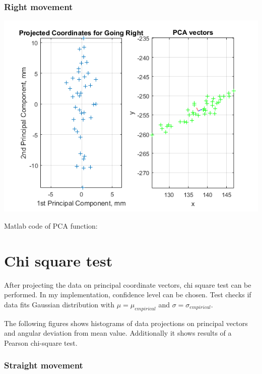 \documentclass[a4paper, 12pt]{article}
\begin{document}
\subsubsection{Right movement}

\begin{center}
  \includegraphics[scale=0.8]{rr1}
\end{center}

\newpage

Matlab code of PCA function:





\section{Chi square test}
After projecting the data on principal coordinate vectors, chi square test can be performed. In my implementation, confidence level can be chosen. Test checks if data fits Gaussian distribution with $\mu = \mu_{empirical}$ and $\sigma = \sigma_{empirical}$.

The following figures shows histograms of data projections on principal vectors and angular deviation from mean value. Additionally it shows results of a Pearson chi-square test.

\newpage

\subsubsection{Straight movement}
\end{document}
